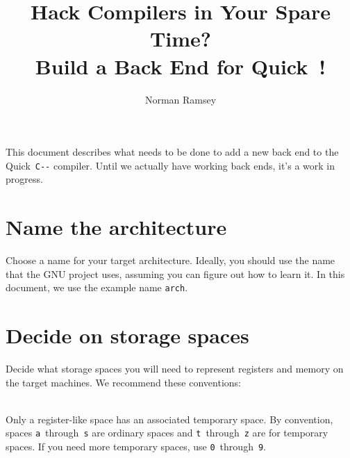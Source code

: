 \documentclass[12pt]{article}
\title{Hack Compilers in Your Spare Time?\\
  Build a Back End for Quick~{\PAL}! \addtherevision}
\author{Norman Ramsey}
\newcommand\PAL{\texttt{C-{}-}}
\begin{document}
\maketitle

{\small
\tableofcontents}

\bigskip

This document describes what needs to be done to add a new back end to
the Quick~{\PAL} compiler.
Until we actually have working back ends, it's a work in progress.

\section{Name the architecture}

Choose a name for your target architecture.
Ideally, you should use the name that the GNU project uses, assuming
you can figure out how to learn it.
In this document, we use the example name \texttt{arch}.

\section{Decide on storage spaces}

\newcommand\inspace[2]{\ensuremath{\$\mathtt{#1}[#2]}}

Decide what storage spaces you will need to represent registers and
memory on the target machines.
We recommend these conventions:\\[3pt]
\\[3pt]
Only a register-like space has an associated temporary
space.
By convention, spaces \texttt{a}~through~\texttt{s} are ordinary
spaces and \texttt{t}~through~\texttt{z} are for temporary spaces.
If you need more temporary spaces, use \texttt{0}~through~\texttt{9}.
\end{document}
